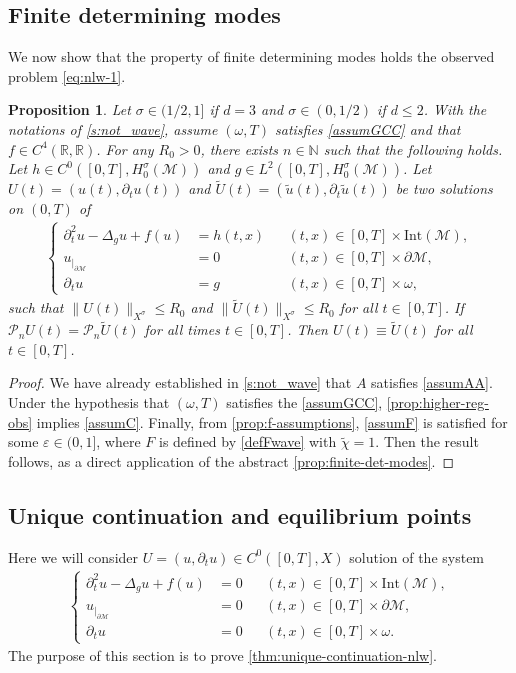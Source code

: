\documentclass[10pt]{amsart}
\newtheorem{proposition}[theorem]{Proposition}
\theoremstyle{definition}
\let\mc\mathcal
\let\veps\varepsilon
\newcommand{\M}{\mc{M}}
\newcommand{\R}{\mathbb{R}}
\newcommand{\N}{\mathbb{N}}
\renewcommand{\P}{\mathcal{P}}
\providecommand{\norm}[1]{\lVert#1\rVert}
\begin{document}
\subsection{Finite determining modes} We now show that the property of finite determining modes holds the observed problem \eqref{eq:nlw-1}.
\begin{proposition}
\label{propfinitedetwave}
Let $\sigma\in (1/2, 1]$ if $d=3$ and $\sigma\in (0,1/2)$ if $d\leq 2$. With the notations of \cref{s:not_wave}, assume $(\omega, T)$ satisfies \ref{assumGCC} and that $f\in C^4(\R, \R)$. For any $R_0>0$, there exists $n\in \N$ such that the following holds. Let $h\in C^0([0,T], H_0^{\sigma}(\M))$ and $g\in L^2([0, T], H_0^\sigma(\M))$. Let $U(t)=(u(t),\partial_t u(t))$ and $\widetilde{U}(t)=(\tilde{u}(t), \partial_t\tilde{u}(t))$ be two solutions on $(0,T)$ of\vspace*{-3pt}
\begin{align}\label{eq:nlw-uc_source}
\left\{\begin{aligned}
\partial_t^2 u-\Delta_g u+f(u)&=h(t, x) &&(t, x)\in [0, T]\times \text{Int}(\M),\\
u_{|_{\partial\M}}&=0 &&(t, x)\in [0, T]\times\partial\M,\\
\partial_t u&=g &&(t, x)\in [0, T]\times \omega,
\end{aligned}\right.
\end{align}
such that $\norm{U(t)}_{X^\sigma}\leq R_{0}$ and $\norm{\widetilde{U}(t)}_{X^\sigma}\leq R_{0}$ for all $t\in [0, T]$. If $\P_n U(t)=\P_n \widetilde{U}(t)$ for all times $t\in [0, T]$. Then $U(t)\equiv \widetilde{U}(t)$ for all $t\in [0, T]$.
\end{proposition}
\begin{proof}
We have already established in \cref{s:not_wave} that $A$ satisfies \cref{assumAA}. Under the hypothesis that $(\omega, T)$ satisfies the \ref{assumGCC}, \cref{prop:higher-reg-obs} implies \cref{assumC}. Finally, from \cref{prop:f-assumptions}, \cref{assumF} is satisfied for some $\veps\in (0, 1]$, where $F$ is defined by \eqref{defFwave} with $\widetilde{\chi}=1$. Then the result follows, as a direct application of the abstract \cref{prop:finite-det-modes}.
\end{proof}

\subsection{Unique continuation and equilibrium points} Here we will consider $U=(u, \partial_t u)\in C^0([0, T], X)$ solution of the system\vspace*{-3pt}
\begin{align}\label{eq:nlw-uc}
\left\{\begin{aligned}
\partial_t^2 u-\Delta_g u+f(u)&=0 &&(t, x)\in [0, T]\times \text{Int}(\M),\\
u_{|_{\partial\M}}&=0 &&(t, x)\in [0, T]\times\partial\M,\\
\partial_t u&=0 &&(t, x)\in [0, T]\times \omega.
\end{aligned}\right.
\end{align}
The purpose of this section is to prove \cref{thm:unique-continuation-nlw}.
\end{document}
